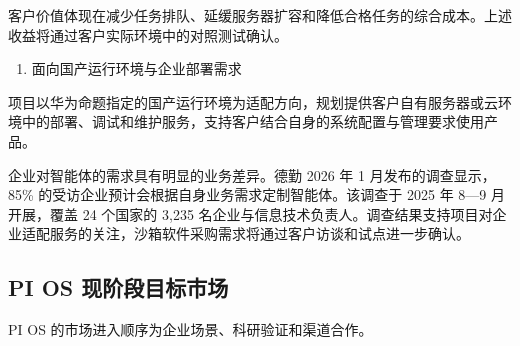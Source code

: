 客户价值体现在减少任务排队、延缓服务器扩容和降低合格任务的综合成本。上述收益将通过客户实际环境中的对照测试确认。

\begin{enumerate}
\item 面向国产运行环境与企业部署需求
\end{enumerate}
项目以华为命题指定的国产运行环境为适配方向，规划提供客户自有服务器或云环境中的部署、调试和维护服务，支持客户结合自身的系统配置与管理要求使用产品。

企业对智能体的需求具有明显的业务差异。德勤 2026 年 1 月发布的调查显示，85\% 的受访企业预计会根据自身业务需求定制智能体。该调查于 2025 年 8---9 月开展，覆盖 24 个国家的 3,235 名企业与信息技术负责人。调查结果支持项目对企业适配服务的关注，沙箱软件采购需求将通过客户访谈和试点进一步确认。

\subsection{PI OS 现阶段目标市场}\label{sec:4.3.2}
PI OS 的市场进入顺序为企业场景、科研验证和渠道合作。


